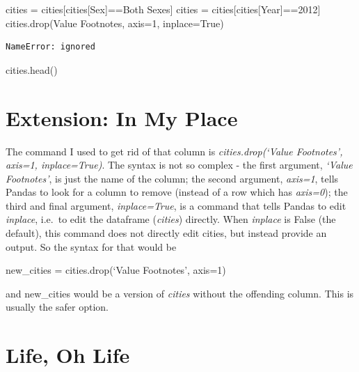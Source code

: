 \documentclass[
  letterpaper,
  DIV=11,
  numbers=noendperiod]{scrreprt}
\newenvironment{Shaded}{\begin{snugshade}}{\end{snugshade}}
\newcommand{\DecValTok}[1]{\textcolor[rgb]{0.68,0.00,0.00}{#1}}
\newcommand{\NormalTok}[1]{\textcolor[rgb]{0.00,0.23,0.31}{#1}}
\newcommand{\OperatorTok}[1]{\textcolor[rgb]{0.37,0.37,0.37}{#1}}
\newcommand{\StringTok}[1]{\textcolor[rgb]{0.13,0.47,0.30}{#1}}
\newcommand{\VariableTok}[1]{\textcolor[rgb]{0.07,0.07,0.07}{#1}}
\begin{document}
\begin{Shaded}
\begin{Highlighting}[]
\NormalTok{cities }\OperatorTok{=}\NormalTok{ cities[cities[}\StringTok{\textquotesingle{}Sex\textquotesingle{}}\NormalTok{]}\OperatorTok{==}\StringTok{\textquotesingle{}Both Sexes\textquotesingle{}}\NormalTok{]}
\NormalTok{cities }\OperatorTok{=}\NormalTok{ cities[cities[}\StringTok{\textquotesingle{}Year\textquotesingle{}}\NormalTok{]}\OperatorTok{==}\DecValTok{2012}\NormalTok{]}
\NormalTok{cities.drop(}\StringTok{\textquotesingle{}Value Footnotes\textquotesingle{}}\NormalTok{, axis}\OperatorTok{=}\DecValTok{1}\NormalTok{, inplace}\OperatorTok{=}\VariableTok{True}\NormalTok{)}
\end{Highlighting}
\end{Shaded}

\begin{verbatim}
NameError: ignored
\end{verbatim}

\begin{Shaded}
\begin{Highlighting}[]
\NormalTok{cities.head()}
\end{Highlighting}
\end{Shaded}

\hypertarget{extension-in-my-place}{%
\section{Extension: In My Place}\label{extension-in-my-place}}

The command I used to get rid of that column is \emph{cities.drop(`Value
Footnotes', axis=1, inplace=True)}. The syntax is not so complex - the
first argument, \emph{`Value Footnotes'}, is just the name of the
column; the second argument, \emph{axis=1}, tells Pandas to look for a
column to remove (instead of a row which has \emph{axis=0}); the third
and final argument, \emph{inplace=True}, is a command that tells Pandas
to edit \emph{inplace}, i.e.~to edit the dataframe (\emph{cities})
directly. When \emph{inplace} is False (the default), this command does
not directly edit cities, but instead provide an output. So the syntax
for that would be

new\_cities = cities.drop(`Value Footnotes', axis=1)

and new\_cities would be a version of \emph{cities} without the
offending column. This is usually the safer option.

\hypertarget{life-oh-life}{%
\section{Life, Oh Life}\label{life-oh-life}}
\end{document}
